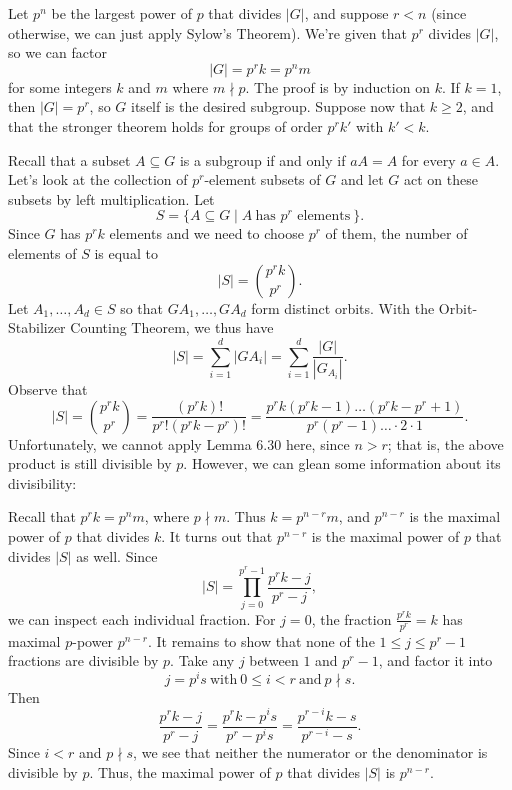 \documentclass{homework}
\begin{document}
\begin{solution}
  Let $p^n$ be the largest power of $p$ that divides $\left| G \right| $, and suppose $r<n$ (since
  otherwise, we can just apply Sylow's Theorem). We're given that $p^r$ divides $\left| G \right| $,
  so we can factor \[
    \left| G \right| =p^rk=p^nm
  \] for some integers $k$ and $m$ where $m\nmid p$. The proof is by induction on $k$. If $k=1$,
  then $\left| G \right| =p^r$, so $G$ itself is the desired subgroup. Suppose now that $k\ge 2$,
  and that the stronger theorem holds for groups of order $p^rk'$ with $k'<k$.

  Recall that a subset $A\subseteq G$ is a subgroup if and only if $aA=A$ for every $a\in A$. Let's
  look at the collection of $p^r$-element subsets of $G$ and let $G$ act on these subsets by left
  multiplication. Let \[
    S=\{A\subseteq G\mid A~\text{has $p^r$ elements}~\} 
  .\] Since $G$ has $p^rk$ elements and we need to choose $p^r$ of them, the number of elements
  of $S$ is equal to \[
    \left| S \right| =\binom{p^rk}{p^r}
  .\] 
  Let $A_1,\ldots,A_d\in S$ so that $GA_1,\ldots,GA_d$ form distinct orbits. With the
  Orbit-Stabilizer Counting Theorem, we thus have \[
    \left| S \right| =\sum_{i=1}^{d} \left| GA_i \right| =\sum_{i=1}^{d} \frac{\left| G \right|
    }{\left| G_{A_i} \right| }
  .\] Observe that \[
    \left| S \right|
    =\binom{p^rk}{p^r}=\frac{(p^rk)!}{p^r!(p^rk-p^r)!}=\frac{p^rk(p^rk-1)\ldots(p^rk-p^r+1)}{p^r(p^r-1)\ldots\cdot
    2\cdot 1}
  .\] Unfortunately, we cannot apply Lemma 6.30 here, since $n>r$; that is, the above product is
  still divisible by $p$. However, we can glean some information about its divisibility:

  \begin{mdframed}
  Recall that $p^rk=p^nm$, where $p\nmid m$. Thus $k=p^{n-r}m$, and $p^{n-r}$ is the maximal power
  of $p$ that divides $k$. It turns out that $p^{n-r}$ is the maximal power of $p$ that divides
  $\left| S \right| $ as well. Since \[
    \left| S \right| =\prod_{j=0}^{p^{r}-1} \frac{p^rk-j}{p^r-j} 
  ,\] we can inspect each individual fraction. For $j=0$, the fraction $\frac{p^rk}{p^r}=k$ has
  maximal $p$-power $p^{n-r}$. It remains to show that none of the $1\le j\le p^r-1$ fractions are
  divisible by $p$. Take any $j$ between $1$ and $p^r-1$, and factor it into \[
    j=p^is~\text{with}~0\le i<r~\text{and}~p\nmid s
  .\] Then \[
    \frac{p^rk-j}{p^r-j}=\frac{p^rk-p^is}{p^r-p^is}=\frac{p^{r-i}k-s}{p^{r-i}-s}
  .\] Since $i<r$ and $p\nmid s$, we see that neither the numerator or the denominator is divisible
  by $p$. Thus, the maximal power of $p$ that divides $\left| S \right| $ is $p^{n-r}$.
  \end{mdframed}


\end{solution}
\end{document}
